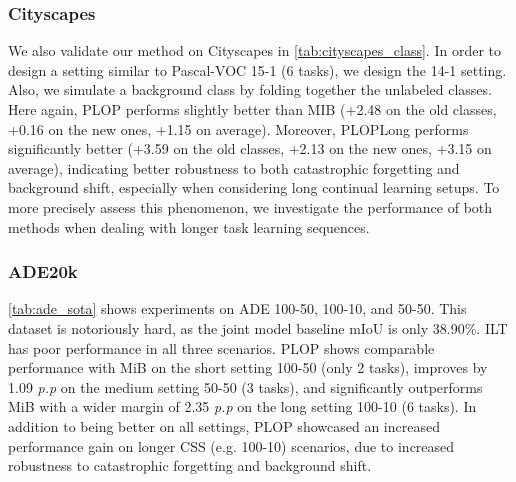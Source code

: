 \subsubsection{Cityscapes}
We also validate our method on Cityscapes in \autoref{tab:cityscapes_class}. In order to design a
setting similar to Pascal-VOC 15-1 (6 tasks), we design the 14-1 setting. Also, we simulate a
background class by folding together the unlabeled classes. Here again, PLOP performs slightly
better than MIB (+2.48 \pp on the old classes, +0.16 \pp on the new ones, +1.15 \pp on average).
Moreover, PLOPLong performs significantly better (+3.59 \pp on the old classes, +2.13 \pp on the new
ones, +3.15 \pp on average), indicating better robustness to both catastrophic forgetting and
background shift, especially when considering long continual learning setups. To more precisely
assess this phenomenon, we investigate the performance of both methods when dealing with longer task
learning sequences.

\subsubsection{ADE20k}
\autoref{tab:ade_sota} shows experiments on ADE 100-50, 100-10, and 50-50. This dataset is
notoriously hard, as the joint model baseline mIoU is only 38.90\%. ILT has poor performance in all
three scenarios. PLOP shows comparable performance with MiB on the short setting 100-50 (only 2
tasks), improves by 1.09 \textit{p.p} on the medium setting 50-50 (3 tasks), and significantly
outperforms MiB with a wider margin of 2.35 \textit{p.p} on the long setting 100-10 (6 tasks). In
addition to being better on all settings, PLOP showcased an increased performance gain on longer CSS
(e.g. 100-10) scenarios, due to increased robustness to catastrophic forgetting and background
shift.






